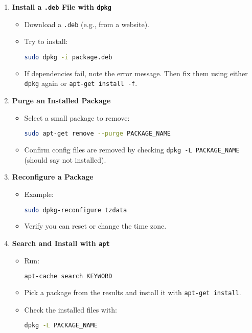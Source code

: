 \documentclass[a4paper]{report}
\begin{document}
\begin{enumerate}
    \item \textbf{Install a \texttt{.deb} File with \texttt{dpkg}}
    \begin{itemize}
        \item Download a \texttt{.deb} (e.g., from a website).
        \item Try to install:
        \begin{lstlisting}[language=bash]
sudo dpkg -i package.deb
        \end{lstlisting}
        \item If dependencies fail, note the error message. Then fix them using either \texttt{dpkg} again or \texttt{apt-get install -f}.
    \end{itemize}

    \item \textbf{Purge an Installed Package}
    \begin{itemize}
        \item Select a small package to remove:
        \begin{lstlisting}[language=bash]
sudo apt-get remove --purge PACKAGE_NAME
        \end{lstlisting}
        \item Confirm config files are removed by checking \texttt{dpkg -L PACKAGE\_NAME} (should say not installed).
    \end{itemize}

    \item \textbf{Reconfigure a Package}
    \begin{itemize}
        \item Example:
        \begin{lstlisting}[language=bash]
sudo dpkg-reconfigure tzdata
        \end{lstlisting}
        \item Verify you can reset or change the time zone.
    \end{itemize}

    \item \textbf{Search and Install with \texttt{apt}}
    \begin{itemize}
        \item Run:
        \begin{lstlisting}[language=bash]
apt-cache search KEYWORD
        \end{lstlisting}
        \item Pick a package from the results and install it with \texttt{apt-get install}.
        \item Check the installed files with:
        \begin{lstlisting}[language=bash]
dpkg -L PACKAGE_NAME
        \end{lstlisting}
    \end{itemize}


\end{enumerate}
\end{document}
